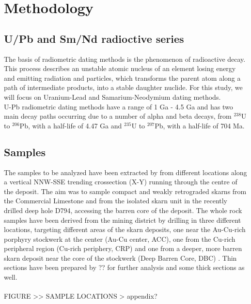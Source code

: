 \documentclass[a4paper,11pt,titlepage]{article}
\begin{document}

\vspace*{10pt}
\section{Methodology}

\subsection{U/Pb and Sm/Nd radioctive series}
The basis of radiometric dating methods is the phenomenon of radioactive decay. This process describes an unstable atomic nucleus of an element losing energy and emitting radiation and particles, which transforms the parent atom along a path of intermediate products, into a stable daughter nuclide. For this study, we will focus on Uranium-Lead and Samarium-Neodymium dating methods.
\\ U-Pb radiometric dating methods have a range of 1 Ga - 4.5 Ga and has two main decay  paths occurring due to a number of alpha and beta decays, from $^{238}$U to $^{206}$Pb, with a half-life of 4.47 Ga and $^{235}$U to $^{207}$Pb, with a half-life of 704 Ma. 

\subsection{Samples}
The samples to be analyzed have been extracted by \citet{Schloeglova2018} from different locations along a vertical NNW-SSE trending crossection (X-Y) running through the centre of the deposit. The aim was to sample compact and weakly retrograded skarns from the Commercial Limestone and from the isolated skarn unit in the recently drilled deep hole D794, accessing the barren core of the deposit. The whole rock samples have been derived from the mining district by drilling in three different locations, targeting different areas of the skarn deposits, one near the Au-Cu-rich porphyry stockwerk at the center (Au-Cu center, ACC), one from the Cu-rich peripheral region (Cu-rich periphery, CRP) and one from a deeper, more barren skarn deposit near the core of the stockwerk (Deep Barren Core, DBC) \citep{Schloeglova2018}. Thin sections have been prepared by ?? for further analysis and some thick sections as well. 
\\
\\ FIGURE >> SAMPLE LOCATIONS >  appendix?
\end{document}

